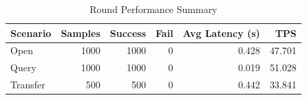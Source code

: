 \begin{table}
\caption{Round Performance Summary}
\label{tab:round_perf}
\begin{tabular}{lrrrrr}
\toprule
Scenario & Samples & Success & Fail & Avg Latency (s) & TPS \\
\midrule
Open & 1000 & 1000 & 0 & 0.428 & 47.701 \\
Query & 1000 & 1000 & 0 & 0.019 & 51.028 \\
Transfer & 500 & 500 & 0 & 0.442 & 33.841 \\
\bottomrule
\end{tabular}
\end{table}

